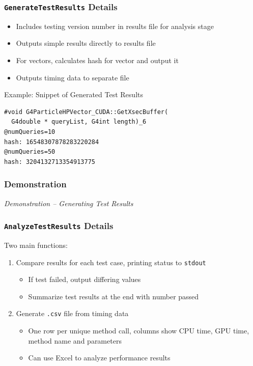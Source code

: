 \documentclass{beamer}
\begin{document}
\begin{frame}[fragile]
\frametitle{\texttt{GenerateTestResults} Details}
\begin{itemize}
\item Includes testing version number in results file for analysis stage
\item Outputs simple results directly to results file
\item For vectors, calculates hash for vector and output it
\item Outputs timing data to separate file
\end{itemize}
\begin{block}{Example: Snippet of Generated Test Results}
\begin{lstlisting}
#void G4ParticleHPVector_CUDA::GetXsecBuffer(
  G4double * queryList, G4int length)_6
@numQueries=10
hash: 16548307878283220284
@numQueries=50
hash: 3204132713354913775
\end{lstlisting}
\end{block}
\end{frame}

\begin{frame}
\frametitle{Demonstration}
\begin{center}
\emph{Demonstration -- Generating Test Results}
\end{center}
\end{frame}

\begin{frame}
\frametitle{\texttt{AnalyzeTestResults} Details}
Two main functions:
\begin{enumerate}
\item Compare results for each test case, printing status to \texttt{stdout}
\begin{itemize}
\item If test failed, output differing values
\item Summarize test results at the end with number passed
\end{itemize}
\item Generate \texttt{.csv} file from timing data
\begin{itemize}
\item One row per unique method call, columns show CPU time, GPU time, method name and parameters
\item Can use Excel to analyze performance results
\end{itemize}
\end{enumerate}
\end{frame}
\end{document}
